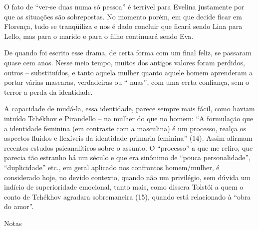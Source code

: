 O fato de ``ver-se duas numa só pessoa'' é terrível para Evelina
justamente por que as situações são sobrepostas. No momento porém, em
que decide ficar em Florença, tudo se tranqüiliza e nos é dado concluir
que ficará sendo Lina para Lello, mas para o marido e para o filho
continuará sendo Eva.

De quando foi escrito esse drama, de certa forma com um final feliz, se
passaram quase cem anos. Nesse meio tempo, muitos dos antigos valores
foram perdidos, outros -- substituídos, e tanto aquela mulher quanto
aquele homem aprenderam a portar várias mascaras, verdadeiras ou ``
nuas'', com uma certa confiança, sem o terror a perda da identidade.

A capacidade de mudá-la, essa identidade, parece sempre mais fácil, como
haviam intuído Tchékhov e Pirandello -- na mulher do que no homem: ``A
formulação que a identidade feminina (em contraste com a masculina) é um
processo, realça os aspectos fluidos e flexíveis da identidade primaria
feminina'' (14). Assim afirmam recentes estudos psicanalíticos sobre o
assunto. O ``processo'' a que me refiro, que parecia tão estranho há um
século e que era sinônimo de ``pouca personalidade'', ``duplicidade''
etc., em geral aplicado nos confrontos homem/mulher, é considerado hoje,
no devido contexto, quando não um privilégio, sem dúvida um indício de
superioridade emocional, tanto mais, como dissera Tolstói a quem o conto
de Tchékhov agradara sobremaneira (15), quando está relacionado à ``obra
do amor''.

Notas

